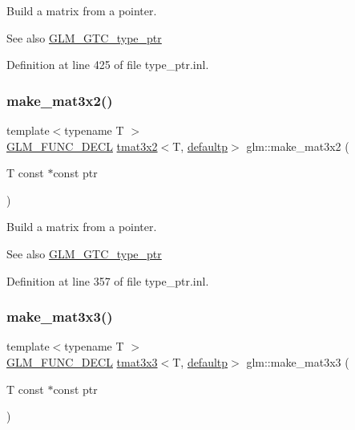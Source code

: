 Build a matrix from a pointer. \begin{DoxySeeAlso}{See also}
\mbox{\hyperlink{group__gtc__type__ptr}{G\+L\+M\+\_\+\+G\+T\+C\+\_\+type\+\_\+ptr}} 
\end{DoxySeeAlso}


Definition at line 425 of file type\+\_\+ptr.\+inl.

\mbox{\label{group__gtc__type__ptr_gabe1e5066608a66da7a94f802b57b4eed}} 
\subsubsection{\texorpdfstring{make\_mat3x2()}{make\_mat3x2()}}
{\footnotesize\ttfamily template$<$typename T $>$ \\
\mbox{\hyperlink{setup_8hpp_ab2d052de21a70539923e9bcbf6e83a51}{G\+L\+M\+\_\+\+F\+U\+N\+C\+\_\+\+D\+E\+CL}} \mbox{\hyperlink{structglm_1_1tmat3x2}{tmat3x2}}$<$T, \mbox{\hyperlink{namespaceglm_a0f04f086094c747d227af4425893f545a9d21ccd8b5a009ec7eb7677befc3bf51}{defaultp}}$>$ glm\+::make\+\_\+mat3x2 (\begin{DoxyParamCaption}\item[{T const $\ast$const}]{ptr }\end{DoxyParamCaption})}

Build a matrix from a pointer. \begin{DoxySeeAlso}{See also}
\mbox{\hyperlink{group__gtc__type__ptr}{G\+L\+M\+\_\+\+G\+T\+C\+\_\+type\+\_\+ptr}} 
\end{DoxySeeAlso}


Definition at line 357 of file type\+\_\+ptr.\+inl.

\mbox{\label{group__gtc__type__ptr_ga3cbe7adf857c867cee77eae4617abadd}} 
\subsubsection{\texorpdfstring{make\_mat3x3()}{make\_mat3x3()}}
{\footnotesize\ttfamily template$<$typename T $>$ \\
\mbox{\hyperlink{setup_8hpp_ab2d052de21a70539923e9bcbf6e83a51}{G\+L\+M\+\_\+\+F\+U\+N\+C\+\_\+\+D\+E\+CL}} \mbox{\hyperlink{structglm_1_1tmat3x3}{tmat3x3}}$<$T, \mbox{\hyperlink{namespaceglm_a0f04f086094c747d227af4425893f545a9d21ccd8b5a009ec7eb7677befc3bf51}{defaultp}}$>$ glm\+::make\+\_\+mat3x3 (\begin{DoxyParamCaption}\item[{T const $\ast$const}]{ptr }\end{DoxyParamCaption})}


